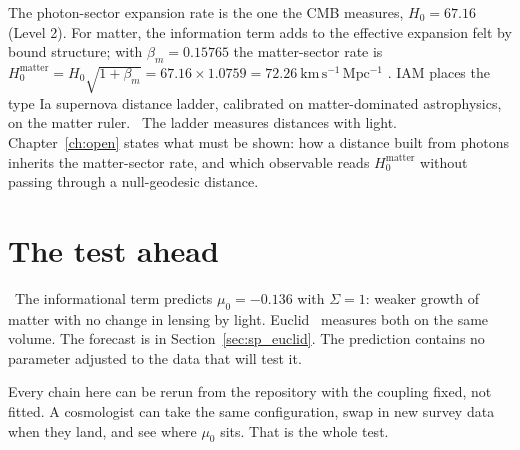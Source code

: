The photon-sector expansion rate is the one the CMB measures, $H_0=67.16$ (Level 2). For matter, the information term adds to the
effective expansion felt by bound structure; with $\beta_m=0.15765$ the matter-sector rate is $H_0^{\mathrm{matter}}=H_0\sqrt{1+\beta_m}=67.16\times1.0759=72.26\ \mathrm{km\,s^{-1}\,Mpc^{-1}}$ \derived.
IAM places the type Ia supernova distance ladder, calibrated on matter-dominated astrophysics, on the matter ruler.
\openprob\ The ladder measures distances with light. Chapter~\ref{ch:open} states what must be shown: how a distance built from photons
inherits the matter-sector rate, and which observable reads $H_0^{\mathrm{matter}}$ without passing through a null-geodesic distance.

\section{The test ahead}

\prediction\ The informational term predicts $\mu_0=-0.136$ with $\Sigma=1$: weaker growth of matter with no change in lensing by light. Euclid~\cite{Euclid2025}
measures both on the same volume. The forecast is in Section~\ref{sec:sp_euclid}.
The prediction contains no parameter adjusted to the data that will test it.

Every chain here can be rerun from the repository with the coupling fixed, not fitted. A cosmologist can take the same configuration, swap in new survey data when they land, and see where $\mu_0$ sits. That is the whole test.
